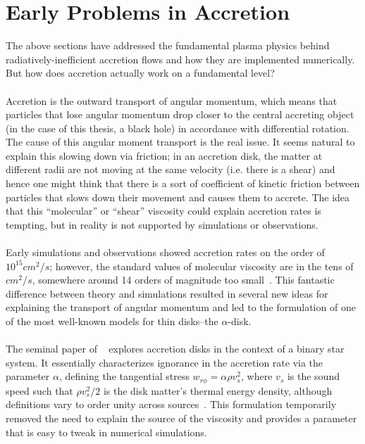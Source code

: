 \section{Early Problems in Accretion}\label{sec:early}
The above sections have addressed the fundamental plasma physics behind radiatively-inefficient accretion flows and how they are implemented numerically. But how does accretion actually work on a fundamental level? \\
\\
Accretion is the outward transport of angular momentum, which means that particles that lose angular momentum drop closer to the central accreting object (in the case of this thesis, a black hole) in accordance with differential rotation. The cause of this angular moment transport is the real issue. It seems natural to explain this slowing down via friction; in an accretion disk, the matter at different radii are not moving at the same velocity (i.e. there is a shear) and hence one might think that there is a sort of coefficient of kinetic friction between particles that slows down their movement and causes them to accrete. The idea that this ``molecular'' or ``shear'' viscosity could explain accretion rates is tempting, but in reality is not supported by simulations or observations.\\
\\
Early simulations and observations showed accretion rates on the order of $10^{15}cm^2/s$; however, the standard values of molecular viscosity are in the tens of $cm^2/s$, somewhere around 14 orders of magnitude too small~\cite{Spruit2009}. This fantastic difference between theory and simulations resulted in several new ideas for explaining the transport of angular momentum and led to the formulation of one of the most well-known models for thin disks--the $\alpha$-disk.\\
\\
The seminal paper of ~\citet{SS1973} explores accretion disks in the context of a binary star system. It essentially characterizes ignorance in the accretion rate via the parameter $\alpha$, defining the tangential stress $w_{r\phi}=\alpha\rho v_s^2$, where $v_s$ is the sound speed such that $\rho v_s^2/2$ is the disk matter's thermal energy density, although definitions vary to order unity across sources~\cite{SS1973}. This formulation temporarily removed the need to explain the source of the viscosity and provides a parameter that is easy to tweak in numerical simulations. \\
\\

